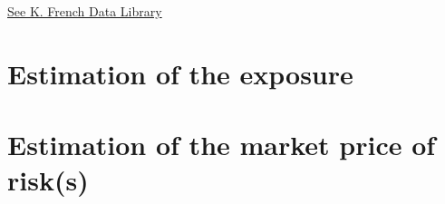 \documentclass[hidelinks,12pts]{article}
\DeclareMathOperator{\1}{\mathbbm{1}}
\begin{document}
\begin{comment}
    
    The Fama/French factors are constructed using the 6 value-weight portfolios formed on size and book-to-market. (See the description of the 6 size/book-to-market portfolios.)
    
    SMB (Small Minus Big) is the average return on the three small portfolios minus the average return on the three big portfolios,
    
    
    SMB = 1/3 (Small Value + Small Neutral + Small Growth) - 1/3 (Big Value + Big Neutral + Big Growth).	 
    
    HML (High Minus Low) is the average return on the two value portfolios minus the average return on the two growth portfolios,
    
    
    HML = 1/2 (Small Value + Big Value) - 1/2 (Small Growth + Big Growth).	 
    
    Rm-Rf, the excess return on the market, value-weight return of all CRSP firms incorporated in the US and listed on the NYSE, AMEX, or NASDAQ that have a CRSP share code of 10 or 11 at the beginning of month t, good shares and price data at the beginning of t, and good return data for t minus the one-month Treasury bill rate (from Ibbotson Associates).
    
    See Fama and French, 1993, "Common Risk Factors in the Returns on Stocks and Bonds," Journal of Financial Economics, for a complete description of the factor returns.
\end{comment}
    
    
    \href{https://mba.tuck.dartmouth.edu/pages/faculty/ken.french/data_library.html}{See K. French Data Library}


\section{Estimation of the exposure}


\section{Estimation of the market price of risk(s)}


\end{document}
